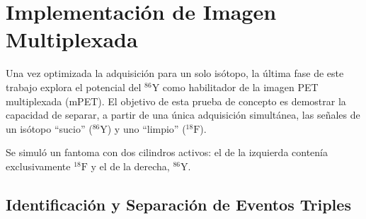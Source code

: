 



\section{Implementación de Imagen Multiplexada}
\label{sec:resultados_discusion:multiplexing}

Una vez optimizada la adquisición para un solo isótopo, la última fase de este trabajo explora el potencial del $^{86}\text{Y}$ como habilitador de la imagen PET multiplexada (mPET). El objetivo de esta prueba de concepto es demostrar la capacidad de separar, a partir de una única adquisición simultánea, las señales de un isótopo \enquote{sucio} ($^{86}\text{Y}$) y uno \enquote{limpio} ($^{18}\text{F}$).

Se simuló un fantoma con dos cilindros activos: el de la izquierda contenía exclusivamente $^{18}\text{F}$ y el de la derecha, $^{86}\text{Y}$.

\subsection{Identificación y Separación de Eventos Triples}
\label{subsec:resultados_triples}


